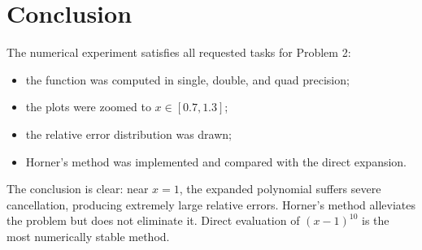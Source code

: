\documentclass[12pt,a4paper]{article}
\begin{document}
\section{Conclusion}

The numerical experiment satisfies all requested tasks for Problem 2:
\begin{itemize}[leftmargin=2.5em]
    \item the function was computed in single, double, and quad precision;
    \item the plots were zoomed to $x\in[0.7,1.3]$;
    \item the relative error distribution was drawn;
    \item Horner's method was implemented and compared with the direct expansion.
\end{itemize}

The conclusion is clear: near $x=1$, the expanded polynomial suffers severe cancellation, producing extremely large relative errors. Horner's method alleviates the problem but does not eliminate it. Direct evaluation of $(x-1)^{10}$ is the most numerically stable method.
\end{document}
